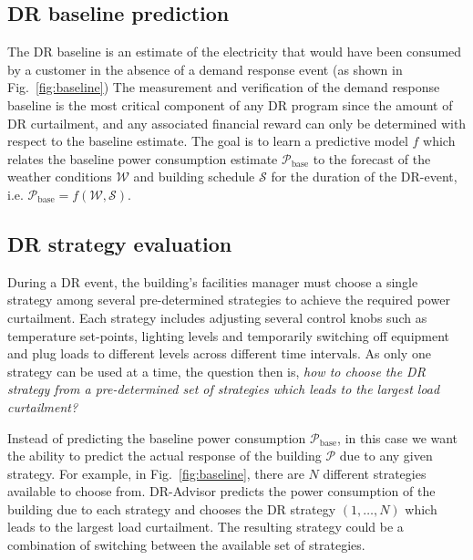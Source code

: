 \subsection{DR baseline prediction}
\label{sec:baselining}
The DR baseline is an estimate of the electricity that would have been consumed by a customer in the absence of a demand response event (as shown in Fig.~\ref{fig:baseline}) 
The measurement and verification of the demand response baseline is the most critical component of any DR program since the amount of DR curtailment, and any associated financial reward can only be determined with respect to the baseline estimate.
The goal is to learn a predictive model $f$ which relates the baseline power consumption estimate $\mathcal{P}_{\mathrm{base}}$ to the forecast of the weather conditions $\mathcal{W}$ and building schedule $\mathcal{S}$ for the duration of the DR-event, i.e. $\mathcal{P}_{\mathrm{base}} = f(\mathcal{W},\mathcal{S})$.


\subsection{DR strategy evaluation}
\label{sec:eval}
During a DR event, the building's facilities manager must choose a single strategy among several pre-determined strategies to achieve the required power curtailment. 
Each strategy includes adjusting several control knobs such as temperature set-points, lighting levels and temporarily switching off equipment and plug loads to different levels across different time intervals. 
As only one strategy can be used at a time, the question then is, \emph{how to choose the DR strategy from a pre-determined set of strategies which leads to the largest load curtailment?}

Instead of predicting the baseline power consumption $\mathcal{P}_{\mathrm{base}}$, in this case we want the ability to predict the actual response of the building $\mathcal{P}$ due to any given strategy.
For example, in Fig.~\ref{fig:baseline}, there are $N$ different strategies available to choose from. 
DR-Advisor predicts the power consumption of the building due to each strategy and chooses the DR strategy $(1,\dots, N)$ which leads to the largest load curtailment.
The resulting strategy could be a combination of switching between the available set of strategies.


